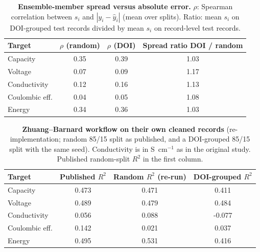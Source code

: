 \documentclass[11pt]{article}
\begin{document}
\begin{table}[htbp]
    \centering\small
    \caption{\textbf{Ensemble-member spread versus absolute error.} $\rho$: Spearman correlation between $s_i$ and $|y_i-\hat y_i|$ (mean over splits). Ratio: mean $s_i$ on DOI-grouped test records divided by mean $s_i$ on record-level test records.}
    \label{tab:unc}
    \begin{tabular}{@{}lccc@{}}
        \toprule
        Target & $\rho$ (random) & $\rho$ (DOI) & Spread ratio DOI / random \\
        \midrule
        Capacity       & 0.35 & 0.39 & 1.03 \\
        Voltage        & 0.07 & 0.09 & 1.17 \\
        Conductivity   & 0.12 & 0.16 & 1.13 \\
        Coulombic eff. & 0.04 & 0.05 & 1.08 \\
        Energy         & 0.34 & 0.36 & 1.03 \\
        \bottomrule
    \end{tabular}
\end{table}



\begin{table}[htbp]
    \centering\small
    \caption{\textbf{Zhuang--Barnard workflow on their own cleaned records} (re-implementation; random 85/15 split as published, and a DOI-grouped 85/15 split with the same seed). Conductivity is in S~cm$^{-1}$ as in the original study. Published random-split $R^2$ in the first column.}
    \label{tab:zbB_esi}
    \begin{tabular}{@{}lccc@{}}
        \toprule
        Target & Published $R^2$ & Random $R^2$ (re-run) & DOI-grouped $R^2$ \\
        \midrule
        Capacity       & 0.473 & 0.471 & 0.411 \\
        Voltage        & 0.489 & 0.479 & 0.484 \\
        Conductivity   & 0.056 & 0.088 & -0.077 \\
        Coulombic eff. & 0.142 & 0.021 & 0.037 \\
        Energy         & 0.495 & 0.531 & 0.416 \\
        \bottomrule
    \end{tabular}
\end{table}
\end{document}
